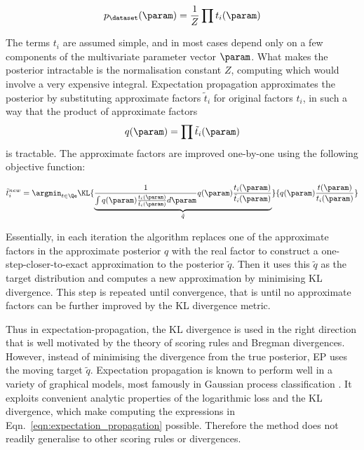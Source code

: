 \begin{equation}
	p_{\dataset}(\param) = \frac{1}{Z} \prod t_i(\param)
\end{equation}

The terms $t_i$ are assumed simple, and in most cases depend only on a few components of the multivariate parameter vector $\param$. What makes the posterior intractable is the normalisation constant $Z$, computing which would involve a very expensive integral. Expectation propagation approximates the posterior by substituting approximate factors $\tilde{t}_i$ for original factors $t_i$, in such a way that the product of approximate factors
\begin{equation}
	q(\param) = \prod \tilde{t}_i(\param)
\end{equation}
is tractable. The approximate factors are improved one-by-one using the following objective function:

\begin{equation}
	\tilde{t}_i^{new} = \argmin_{t \in \Qe} \KL{\underbrace{\frac{1}{\int q(\param)\frac{t_i(\param)}{\tilde{t}_i(\param)} d\param}q(\param)\frac{t_i(\param)}{\tilde{t}_i(\param)}}_{\tilde{q}}}{q(\param)\frac{t(\param)}{t_i(\param)}} \label{eqn:expectation_propagation}
\end{equation}

Essentially, in each iteration the algorithm replaces one of the approximate factors in the approximate posterior $q$ with the real factor to construct a one-step-closer-to-exact approximation to the posterior $\tilde{q}$. Then it uses this $\tilde{q}$ as the target distribution and computes a new approximation by minimising KL divergence. This step is repeated until convergence, that is until no approximate factors can be further improved by the KL divergence metric.

Thus in expectation-propagation, the KL divergence is used in the right direction that is well motivated by the theory of scoring rules and Bregman divergences. However, instead of minimising the divergence from the true posterior, EP uses the moving target $\tilde{q}$. Expectation propagation is known to perform well in a variety of graphical models, most famously in Gaussian process classification \citep{Nickisch2008}. It exploits convenient analytic properties of the logarithmic loss and the KL divergence, which make computing the expressions in Eqn.\ \eqref{eqn:expectation_propagation} possible. Therefore the method does not readily generalise to other scoring rules or divergences.

